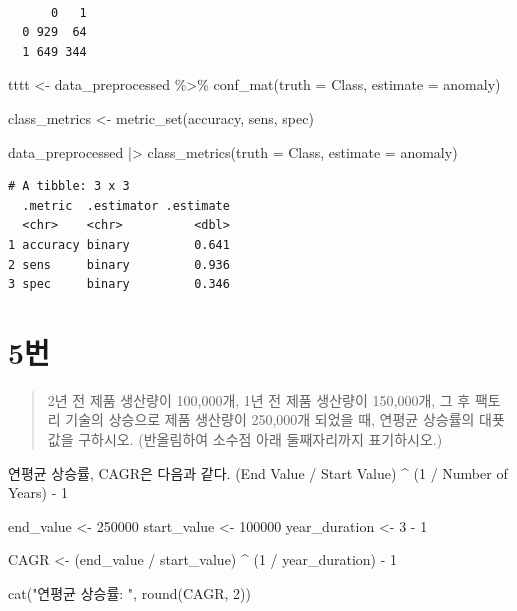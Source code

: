 \documentclass[
  letterpaper,
  DIV=11,
  numbers=noendperiod]{scrreprt}
\newenvironment{Shaded}{\begin{snugshade}}{\end{snugshade}}
\newcommand{\AttributeTok}[1]{\textcolor[rgb]{0.40,0.45,0.13}{#1}}
\newcommand{\DecValTok}[1]{\textcolor[rgb]{0.68,0.00,0.00}{#1}}
\newcommand{\FunctionTok}[1]{\textcolor[rgb]{0.28,0.35,0.67}{#1}}
\newcommand{\NormalTok}[1]{\textcolor[rgb]{0.00,0.23,0.31}{#1}}
\newcommand{\OtherTok}[1]{\textcolor[rgb]{0.00,0.23,0.31}{#1}}
\newcommand{\SpecialCharTok}[1]{\textcolor[rgb]{0.37,0.37,0.37}{#1}}
\newcommand{\StringTok}[1]{\textcolor[rgb]{0.13,0.47,0.30}{#1}}
\begin{document}
\begin{verbatim}
   
      0   1
  0 929  64
  1 649 344
\end{verbatim}

\begin{Shaded}
\begin{Highlighting}[]
\NormalTok{tttt }\OtherTok{\textless{}{-}}\NormalTok{ data\_preprocessed }\SpecialCharTok{\%\textgreater{}\%} 
  \FunctionTok{conf\_mat}\NormalTok{(}\AttributeTok{truth =}\NormalTok{ Class, }\AttributeTok{estimate =}\NormalTok{ anomaly) }


\NormalTok{class\_metrics }\OtherTok{\textless{}{-}} \FunctionTok{metric\_set}\NormalTok{(accuracy, sens, spec)}

\NormalTok{data\_preprocessed }\SpecialCharTok{|\textgreater{}}
  \FunctionTok{class\_metrics}\NormalTok{(}\AttributeTok{truth =}\NormalTok{ Class, }\AttributeTok{estimate =}\NormalTok{ anomaly)}
\end{Highlighting}
\end{Shaded}

\begin{verbatim}
# A tibble: 3 x 3
  .metric  .estimator .estimate
  <chr>    <chr>          <dbl>
1 accuracy binary         0.641
2 sens     binary         0.936
3 spec     binary         0.346
\end{verbatim}

\hypertarget{uxbc88-12}{%
\chapter*{5번}\label{uxbc88-12}}


\begin{quote}
2년 전 제품 생산량이 100,000개, 1년 전 제품 생산량이 150,000개, 그 후
팩토리 기술의 상승으로 제품 생산량이 250,000개 되었을 때, 연평균
상승률의 대푯값을 구하시오. (반올림하여 소수점 아래 둘째자리까지
표기하시오.)
\end{quote}

연평균 상승률, CAGR은 다음과 같다. (End Value / Start Value) \^{} (1 /
Number of Years) - 1

\begin{Shaded}
\begin{Highlighting}[]
\NormalTok{end\_value }\OtherTok{\textless{}{-}} \DecValTok{250000}
\NormalTok{start\_value }\OtherTok{\textless{}{-}} \DecValTok{100000}
\NormalTok{year\_duration }\OtherTok{\textless{}{-}} \DecValTok{3} \SpecialCharTok{{-}} \DecValTok{1}

\NormalTok{CAGR }\OtherTok{\textless{}{-}}\NormalTok{ (end\_value }\SpecialCharTok{/}\NormalTok{ start\_value) }\SpecialCharTok{\^{}}\NormalTok{ (}\DecValTok{1} \SpecialCharTok{/}\NormalTok{ year\_duration)  }\SpecialCharTok{{-}}  \DecValTok{1}

\FunctionTok{cat}\NormalTok{(}\StringTok{"연평균 상승률: "}\NormalTok{, }\FunctionTok{round}\NormalTok{(CAGR, }\DecValTok{2}\NormalTok{))}
\end{Highlighting}
\end{Shaded}
\end{document}
